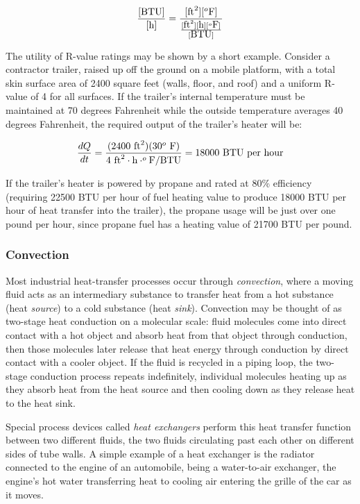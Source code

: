 $${[\hbox{BTU}] \over [\hbox{h}]} = {[\hbox{ft}^2] [^{o}\hbox{F}] \over {{[\hbox{ft}^2] [\hbox{h}] [^{o}\hbox{F}]} \over [\hbox{BTU}]}}$$

\filbreak

The utility of R-value ratings may be shown by a short example.  Consider a contractor trailer, raised up off the ground on a mobile platform, with a total skin surface area of 2400 square feet (walls, floor, and roof) and a uniform R-value of 4 for all surfaces.  If the trailer's internal temperature must be maintained at 70 degrees Fahrenheit while the outside temperature averages 40 degrees Fahrenheit, the required output of the trailer's heater will be:

$${dQ \over dt} = {(2400 \hbox{ ft}^2) ({30 ^o \hbox{ F})} \over {4 \hbox{ ft}^2 \cdot \hbox{h} \cdot ^{o}\hbox{F} / \hbox{BTU}}} = 18000 \hbox{ BTU per hour}$$

If the trailer's heater is powered by propane and rated at 80\% efficiency (requiring 22500 BTU per hour of fuel heating value to produce 18000 BTU per hour of heat transfer into the trailer), the propane usage will be just over one pound per hour, since propane fuel has a heating value of 21700 BTU per pound.



\filbreak
\subsubsection{Convection}

Most industrial heat-transfer processes occur through \textit{convection}, where a moving fluid acts as an intermediary substance to transfer heat from a hot substance (heat \textit{source}) to a cold substance (heat \textit{sink}).  Convection may be thought of as two-stage heat conduction on a molecular scale: fluid molecules come into direct contact with a hot object and absorb heat from that object through conduction, then those molecules later release that heat energy through conduction by direct contact with a cooler object.  If the fluid is recycled in a piping loop, the two-stage conduction process repeats indefinitely, individual molecules heating up as they absorb heat from the heat source and then cooling down as they release heat to the heat sink.     

Special process devices called \textit{heat exchangers} perform this heat transfer function between two different fluids, the two fluids circulating past each other on different sides of tube walls.  A simple example of a heat exchanger is the radiator connected to the engine of an automobile, being a water-to-air exchanger, the engine's hot water transferring heat to cooling air entering the grille of the car as it moves.    

